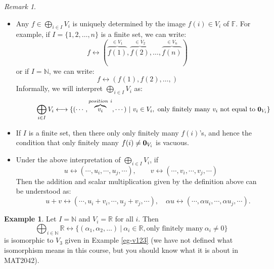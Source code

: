 \documentclass[11pt,openany]{book}
\theoremstyle{plain}
\theoremstyle{definition}
\newtheorem{example}[example]{Example}
\theoremstyle{remark}
\newtheorem{remark}[remark]{Remark}
\begin{document}
\begin{remark}\
    \begin{itemize}
        \item Any $f \in \bigoplus_{i \in I} V_i$ is uniquely determined by the image $f(i) \in V_i$ of $\mathbb{F}$. For example, if $I = \{1,2,  \dots, n\}$ is a finite set, we can write:
        $$f \longleftrightarrow (\overbrace{f(1)}^{\in V_1}, \overbrace{f(2)}^{\in V_2}, \dots, \overbrace{f(n)}^{\in V_n})$$
        or if $I = \mathbb{N}$, we can write:
        $$f \longleftrightarrow (f(1), f(2), \dots, )$$
        Informally, we will interpret $\bigoplus_{i \in I} V_i$ as:
        $$\quad \quad \quad \bigoplus_{i \in I} V_i \longleftrightarrow \{ (\cdots, \overbrace{v_i}^{position\ i}, \cdots )\ |\ v_i \in V_i,\ \text{only finitely many}\ v_i\ \text{not equal to}\ {\bf 0}_{V_i}\}$$

        \item If $I$ is a finite set, then there only only finitely many $f(i)$'s, and hence the condition that only finitely many $f(i) \neq {\bf 0}_{V_i}$ is vacuous.

        \item Under the above interpretation of $\bigoplus_{i \in I} V_i$, if
        $$\quad u \longleftrightarrow (\cdots, u_i, \cdots, u_j, \cdots ),\quad \quad v \longleftrightarrow (\cdots, v_i, \cdots, v_j, \cdots )$$
        Then the addition and scalar multiplication given by the definition above can be understood as:
        $$\quad \quad \quad u+v \longleftrightarrow (\cdots, u_i + v_i, \cdots, u_j+v_j, \cdots ), \quad \alpha u \longleftrightarrow (\cdots, \alpha u_i, \cdots, \alpha u_j, \cdots ).$$
    \end{itemize}
\end{remark}

\begin{example}
    Let $I = \mathbb{N}$ and $V_i = \mathbb{R}$ for all $i$. Then
    $$\bigoplus_{i \in \mathbb{N}} \mathbb{R} \longleftrightarrow \{(\alpha_1, \alpha_2, \dots)\ |\ \alpha_i \in \mathbb{R}, \text{only finitely many}\ \alpha_i \neq 0\}$$
    is isomorphic to $V_3$ given in Example \ref{eg-v123} (we have not defined what isomorphism means in this course, but you should know what it is about in MAT2042).
\end{example}
\end{document}

